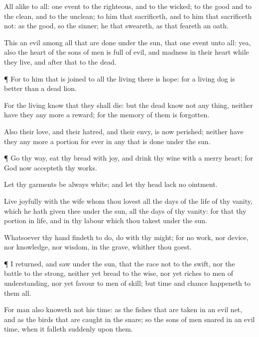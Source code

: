 {All
{} alike to all:
{}
one
event to the
righteous, and to the
wicked; to the
good and to the
clean, and to the
unclean; to him that
sacrificeth, and to him
that
sacrificeth not: as
{} the
good, so
{} the
sinner;
{} he that
sweareth, as
{} that
feareth an
oath.

This
{} an
evil among all
{} that are
done under the
sun, that
{}
one
event unto all: yea, also the
heart of the
sons of
men is
full of
evil, and
madness
{} in their
heart while they
live, and
after that
{} to the
dead.


\par }{\PP {}¶
For to him that
is
joined to all the
living there is
hope: for a
living
dog is
better than a
dead
lion.

For the
living
know that they shall
die: but the
dead
know not any
thing, neither have they any more a
reward; for the
memory of them is
forgotten.

Also their
love, and their
hatred, and their
envy, is
now
perished; neither have they any more a
portion for
ever in any
{} that is
done under the
sun.


\par }{\PP {}¶ Go thy
way,
eat thy
bread with
joy, and
drink thy
wine with a
merry
heart; for
God
now
accepteth thy
works.

Let thy
garments be
always
white; and let thy
head
lack no
ointment.

Live
joyfully with the
wife whom thou
lovest all the
days of the
life of thy
vanity, which he hath
given thee under the
sun, all the
days of thy
vanity: for that
{} thy
portion in
{}
life, and in thy
labour which thou
takest under the
sun.

Whatsoever thy
hand
findeth to
do,
do
{} with thy
might; for
{} no
work, nor
device, nor
knowledge, nor
wisdom, in the
grave, whither thou
goest.


\par }{\PP {}¶ I
returned, and
saw under the
sun, that the
race
{} not to the
swift, nor the
battle to the
strong, neither yet
bread to the
wise, nor yet
riches to men of
understanding, nor yet
favour to men of
skill; but
time and
chance
happeneth to them all.

For
man also
knoweth not his
time: as the
fishes that are
taken in an
evil
net, and as the
birds that are
caught in the
snare;
so
{} the
sons of
men
snared in an
evil
time, when it
falleth
suddenly upon them.


}
